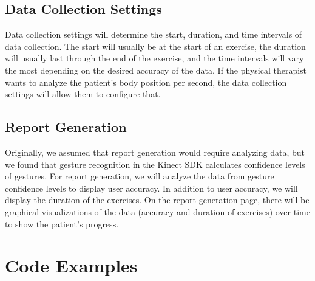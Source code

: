 \documentclass[onecolumn, draftclsnofoot,10pt, compsoc]{IEEEtran}
\begin{document}
\subsection{Data Collection Settings}
Data collection settings will determine the start, duration, and time intervals of data collection. The start will usually be at the start of an exercise, the duration will usually last through the end of the exercise, and the time intervals will vary the most depending on the desired accuracy of the data. If the physical therapist wants to analyze the patient's body position per second, the data collection settings will allow them to configure that. 

\subsection{Report Generation}
Originally, we assumed that report generation would require analyzing data, but we found that gesture recognition in the Kinect SDK calculates confidence levels of gestures. For report generation, we will analyze the data from gesture confidence levels to display user accuracy. In addition to user accuracy, we will display the duration of the exercises. On the report generation page, there will be graphical visualizations of the data (accuracy and duration of exercises) over time to show the patient's progress.

\section{Code Examples}
\end{document}
